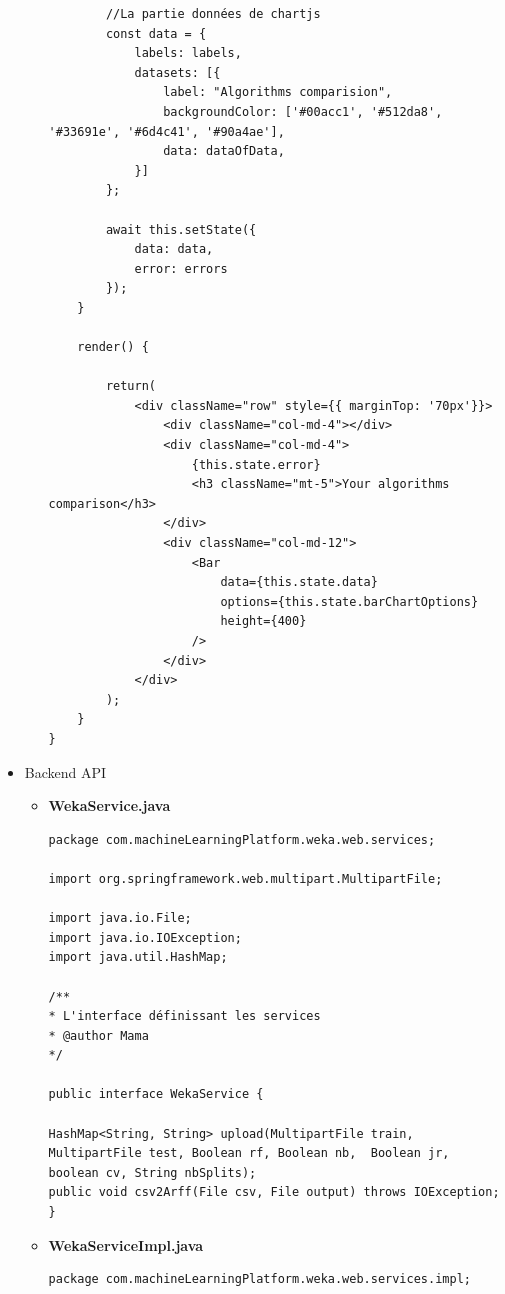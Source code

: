 \documentclass[a4paper,11pt]{article}
\begin{document}
\begin{itemize}
\begin{itemize}
\begin{verbatim}
        //La partie données de chartjs
        const data = {
            labels: labels,
            datasets: [{
                label: "Algorithms comparision",
                backgroundColor: ['#00acc1', '#512da8', '#33691e', '#6d4c41', '#90a4ae'],
                data: dataOfData,
            }]
        };

        await this.setState({
            data: data,
            error: errors
        });
    }

    render() {

        return(
            <div className="row" style={{ marginTop: '70px'}}>
                <div className="col-md-4"></div>
                <div className="col-md-4">
                    {this.state.error}
                    <h3 className="mt-5">Your algorithms comparison</h3>
                </div>
                <div className="col-md-12">
                    <Bar
                        data={this.state.data}
                        options={this.state.barChartOptions}
                        height={400}
                    />
                </div>
            </div>
        );
    }
}

\end{verbatim}
\end{itemize}
\item Backend API
\begin{itemize}
\item \textbf{WekaService.java}
\begin{verbatim}
package com.machineLearningPlatform.weka.web.services;

import org.springframework.web.multipart.MultipartFile;

import java.io.File;
import java.io.IOException;
import java.util.HashMap;

/**
* L'interface définissant les services
* @author Mama
*/

public interface WekaService {

HashMap<String, String> upload(MultipartFile train, MultipartFile test, Boolean rf, Boolean nb,  Boolean jr, boolean cv, String nbSplits);
public void csv2Arff(File csv, File output) throws IOException;
}

\end{verbatim}
\item \textbf{WekaServiceImpl.java}
\begin{verbatim}
package com.machineLearningPlatform.weka.web.services.impl;


\end{verbatim}
\end{itemize}
\end{itemize}
\end{document}
